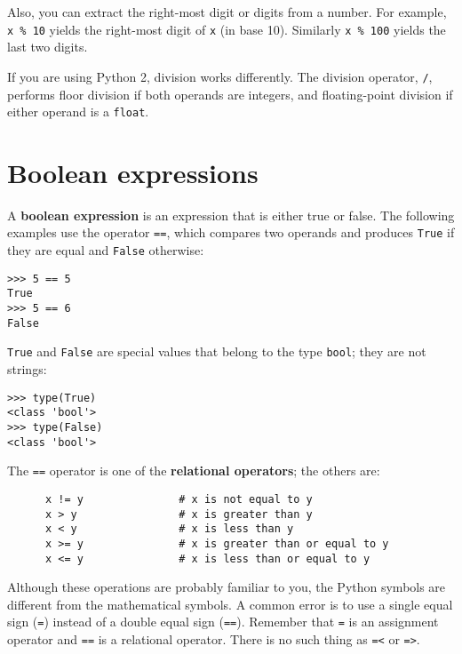 Also, you can extract the right-most digit
or digits from a number.  For example, {\tt x \% 10} yields the
right-most digit of {\tt x} (in base 10).  Similarly {\tt x \% 100}
yields the last two digits.

If you are using Python 2, division works differently.  The
division operator, \verb"/", performs floor division if both
operands are integers, and floating-point division if either
operand is a {\tt float}.


\section{Boolean expressions}

A {\bf boolean expression} is an expression that is either true
or false.  The following examples use the 
operator {\tt ==}, which compares two operands and produces
{\tt True} if they are equal and {\tt False} otherwise:

\begin{verbatim}
>>> 5 == 5
True
>>> 5 == 6
False
\end{verbatim}
%
{\tt True} and {\tt False} are special
values that belong to the type {\tt bool}; they are not strings:

\begin{verbatim}
>>> type(True)
<class 'bool'>
>>> type(False)
<class 'bool'>
\end{verbatim}
%
The {\tt ==} operator is one of the {\bf relational operators}; the
others are:

\begin{verbatim}
      x != y               # x is not equal to y
      x > y                # x is greater than y
      x < y                # x is less than y
      x >= y               # x is greater than or equal to y
      x <= y               # x is less than or equal to y
\end{verbatim}
%
Although these operations are probably familiar to you, the Python
symbols are different from the mathematical symbols.  A common error
is to use a single equal sign ({\tt =}) instead of a double equal sign
({\tt ==}).  Remember that {\tt =} is an assignment operator and
{\tt ==} is a relational operator.   There is no such thing as
{\tt =<} or {\tt =>}.


